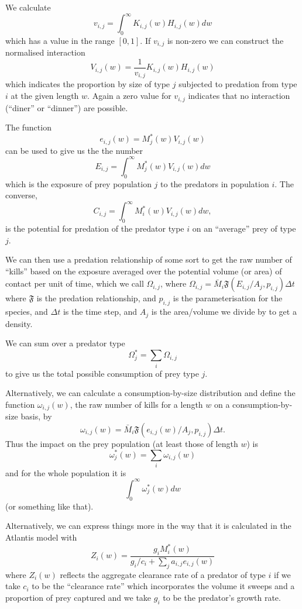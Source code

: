 We calculate
\[ v_{i,j} = \int_0^{\infty} K_{i,j} (w) H_{i,j} (w) dw \]
which has a value in the range $[0, 1]$. If $v_{i,j}$ is non-zero we can
construct the normalised interaction
\[ V_{i,j} (w) = \frac{1}{v_{i,j}} K_{i,j} (w) H_{i,j} (w) \]
which indicates the proportion by size of type $j$ subjected to predation from
type $i$ at the given length $w$. Again a zero value for $v_{i,j}$ indicates
that no interaction (``diner'' or ``dinner'') are possible.



The function
\[ e_{i,j} (w) = M^{\ast}_j (w) V_{i,j} (w)  \]
can be used to give us the the number
\[ E_{i,j} = \int_0^{\infty} M^{\ast}_j (w) V_{i,j} (w) d w \]
which is the exposure of prey population $j$ to the predators in
population $i$. The converse,
\[ C_{i,j} = \int_0^{\infty} M_i^{\ast} (w) V_{i,j} (w) d w, \]
is the potential for predation of the predator type $i$ on an ``average'' prey
of type $j$.

We can then use a predation relationship of some sort to get the raw
number of ``kills'' based on the exposure averaged over the potential
volume (or area) of contact per unit of time, which we call $\Omega_{i,j}$, where $\Omega_{i,j} = \bar{M}_i \mathfrak{F} (E_{i,j} / A_j,
p_{i,j}) \Delta t$ where $\mathfrak{F}$ is the predation relationship,
and $p_{i,j}$ is the parameterisation for the species, and $\Delta t$
is the time step, and $A_j$ is the area/volume we divide by to get a
density.

We can sum over a predator type
\[ \Omega_j^{\ast} = \sum_i \Omega_{i,j} \]
to give us the total possible consumption of prey type $j$.

Alternatively, we can calculate a consumption-by-size distribution and define
the function $\omega_{i,j} (w)$, the raw number of kills for a length $w$ on a
consumption-by-size basis, by
\[ \omega_{i,j} (w) = \bar{M}_i \mathfrak{F} (e_{i,j} (w) / A_j, p_{i,j})
\Delta t. \]
Thus the impact on the prey population (at least those of length $w$) is
\[ \omega_j^{\ast} (w) = \sum_i \omega_{i,j} (w) \]
and for the whole population it is
\[ \int_0^{\infty} \omega^{\ast}_j (w) d w \]
(or something like that).

Alternatively, we can express things more in the way that it is
calculated in the Atlantis model \citep{Fulton2011pcomm} with
\[ Z_i (w) = \frac{g_i M^{\ast}_i (w)}{g_i / c_i + \sum_j a_{i,j} e_{i,j} (w)}
\]
where $Z_i (w)$ reflects the aggregate clearance rate of a predator of type
$i$ if we take $c_i$ to be the ``clearance rate'' which incorporates the
volume it sweeps and a proportion of prey captured and we take $g_i$ to be the
predator's growth rate.

